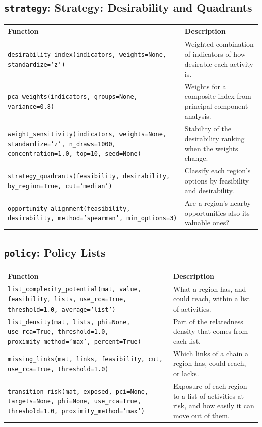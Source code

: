 \subsection{\texttt{strategy}: Strategy: Desirability and Quadrants}
\begin{longtable}{>{\raggedright\arraybackslash}p{9.2cm} >{\raggedright\arraybackslash}p{7.0cm}}
\toprule
\textbf{Function} & \textbf{Description} \\
\midrule\endhead
\texttt{\footnotesize desirability\_index(indicators, weights=None, standardize='z')} & {\small Weighted combination of indicators of how desirable each activity is.} \\[2pt]
\texttt{\footnotesize pca\_weights(indicators, groups=None, variance=0.8)} & {\small Weights for a composite index from principal component analysis.} \\[2pt]
\texttt{\footnotesize weight\_sensitivity(indicators, weights=None, standardize='z', n\_draws=1000, concentration=1.0, top=10, seed=None)} & {\small Stability of the desirability ranking when the weights change.} \\[2pt]
\texttt{\footnotesize strategy\_quadrants(feasibility, desirability, by\_region=True, cut='median')} & {\small Classify each region's options by feasibility and desirability.} \\[2pt]
\texttt{\footnotesize opportunity\_alignment(feasibility, desirability, method='spearman', min\_options=3)} & {\small Are a region's nearby opportunities also its valuable ones?} \\[2pt]
\bottomrule
\end{longtable}

\subsection{\texttt{policy}: Policy Lists}
\begin{longtable}{>{\raggedright\arraybackslash}p{9.2cm} >{\raggedright\arraybackslash}p{7.0cm}}
\toprule
\textbf{Function} & \textbf{Description} \\
\midrule\endhead
\texttt{\footnotesize list\_complexity\_potential(mat, value, feasibility, lists, use\_rca=True, threshold=1.0, average='list')} & {\small What a region has, and could reach, within a list of activities.} \\[2pt]
\texttt{\footnotesize list\_density(mat, lists, phi=None, use\_rca=True, threshold=1.0, proximity\_method='max', percent=True)} & {\small Part of the relatedness density that comes from each list.} \\[2pt]
\texttt{\footnotesize missing\_links(mat, links, feasibility, cut, use\_rca=True, threshold=1.0)} & {\small Which links of a chain a region has, could reach, or lacks.} \\[2pt]
\texttt{\footnotesize transition\_risk(mat, exposed, pci=None, targets=None, phi=None, use\_rca=True, threshold=1.0, proximity\_method='max')} & {\small Exposure of each region to a list of activities at risk, and how easily it can move out of them.} \\[2pt]
\bottomrule
\end{longtable}

